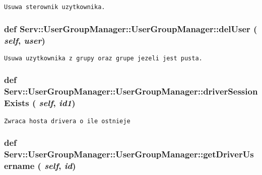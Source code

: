 \footnotesize\begin{verbatim}Usuwa sterownik uzytkownika.\end{verbatim}
\normalsize
 \hypertarget{class_serv_1_1_user_group_manager_1_1_user_group_manager_4b747272c8166d17b9458b3f8c4796f0}{
\subsubsection[{delUser}]{\setlength{\rightskip}{0pt plus 5cm}def Serv::UserGroupManager::UserGroupManager::delUser ( {\em self}, \/   {\em user})}}
\label{class_serv_1_1_user_group_manager_1_1_user_group_manager_4b747272c8166d17b9458b3f8c4796f0}




\footnotesize\begin{verbatim}Usuwa uzytkownika z grupy oraz grupe jezeli jest pusta.\end{verbatim}
\normalsize
 \hypertarget{class_serv_1_1_user_group_manager_1_1_user_group_manager_2911282f4333a88387427c1563649a52}{
\subsubsection[{driverSessionExists}]{\setlength{\rightskip}{0pt plus 5cm}def Serv::UserGroupManager::UserGroupManager::driverSessionExists ( {\em self}, \/   {\em id1})}}
\label{class_serv_1_1_user_group_manager_1_1_user_group_manager_2911282f4333a88387427c1563649a52}




\footnotesize\begin{verbatim}Zwraca hosta drivera o ile ostnieje\end{verbatim}
\normalsize
 \hypertarget{class_serv_1_1_user_group_manager_1_1_user_group_manager_7429d0df435f9c1e758d59aa250b4d76}{
\subsubsection[{getDriverUsername}]{\setlength{\rightskip}{0pt plus 5cm}def Serv::UserGroupManager::UserGroupManager::getDriverUsername ( {\em self}, \/   {\em id})}}
\label{class_serv_1_1_user_group_manager_1_1_user_group_manager_7429d0df435f9c1e758d59aa250b4d76}




